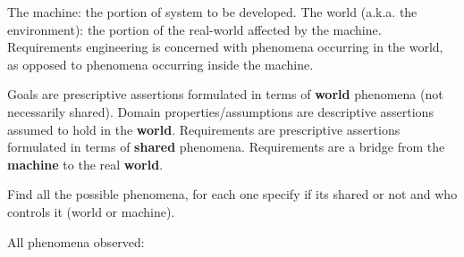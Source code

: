 The machine: the portion of system to be developed.
The world (a.k.a. the environment): the portion of the real-world affected by the machine.
Requirements engineering is concerned with phenomena occurring in the world, as opposed to phenomena occurring inside the machine.

Goals are prescriptive assertions formulated in terms of \textbf{world} phenomena (not necessarily shared).
Domain properties/assumptions are descriptive assertions assumed to hold in the \textbf{world}.
Requirements are prescriptive assertions formulated in terms of \textbf{shared} phenomena.
Requirements are a bridge from the \textbf{machine} to the real \textbf{world}.

Find all the possible phenomena, for each one specify if its shared or not and who controls it (world or machine). 

All phenomena observed:

